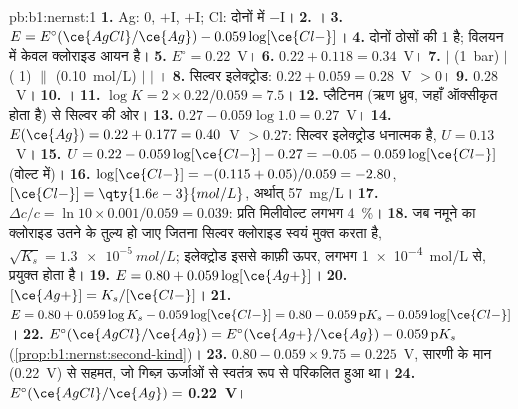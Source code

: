 \begin{solution}{pb:b1:nernst:1}
\textbf{1.} Ag: 0, $+$I, $+$I; Cl: दोनों में $-$I।
\textbf{2.} ।
\textbf{3.} $E = E^\circ(\ce{AgCl}/\ce{Ag}) - 0.059\log[\ce{Cl-}]$।
\textbf{4.} दोनों ठोसों की  1 है; विलयन में केवल क्लोराइड आयन
है।
\textbf{5.} $E^\circ = 0.22$~V।
\textbf{6.} $0.22 + 0.118 = 0.34$~V।
\textbf{7.}  $|$  (\qty{1}{bar}) $|$  ( 1)
$\|$  (\qty{0.10}{mol/L}) $|$  $|$ ।
\textbf{8.} सिल्वर इलेक्ट्रोड: $0.22 + 0.059 = 0.28$~V $> 0$।
\textbf{9.} $0.28$~V।
\textbf{10.} ।
\textbf{11.} $\log K = 2 \times 0.22/0.059 = 7.5$।
\textbf{12.} प्लैटिनम (ऋण ध्रुव, जहाँ  ऑक्सीकृत होता है) से
सिल्वर की ओर।
\textbf{13.} $0.27 - 0.059\log 1.0 = 0.27$~V।
\textbf{14.} $E(\ce{Ag}) = 0.22 + 0.177 = 0.40$~V $> 0.27$: सिल्वर
इलेक्ट्रोड धनात्मक है, $U = 0.13$~V।
\textbf{15.} $U = 0.22 - 0.059\log[\ce{Cl-}] - 0.27 = -0.05 -
0.059\log[\ce{Cl-}]$ (वोल्ट में)।
\textbf{16.} $\log[\ce{Cl-}] = -(0.115 + 0.05)/0.059 = -2.80$,
$[\ce{Cl-}] = \qty{1.6e-3}{mol/L}$, अर्थात् \qty{57}{mg/L}।
\textbf{17.} $\Delta c/c = \ln 10 \times 0.001/0.059 = 0.039$: प्रति मिलीवोल्ट लगभग
\qty{4}{\percent}।
\textbf{18.} जब नमूने का क्लोराइड उतने के तुल्य हो जाए जितना
सिल्वर क्लोराइड स्वयं मुक्त करता है, $\sqrt{K_s} = \qty{1.3e-5}{mol/L}$;
इलेक्ट्रोड इससे काफ़ी ऊपर, लगभग \qty{1e-4}{mol/L} से, प्रयुक्त होता है।
\textbf{19.} $E = 0.80 + 0.059\log[\ce{Ag+}]$।
\textbf{20.} $[\ce{Ag+}] = K_s/[\ce{Cl-}]$।
\textbf{21.} $E = 0.80 + 0.059\log K_s - 0.059\log[\ce{Cl-}] = 0.80 -
0.059\,\mathrm{p}K_s - 0.059\log[\ce{Cl-}]$।
\textbf{22.} $E^\circ(\ce{AgCl}/\ce{Ag}) = E^\circ(\ce{Ag+}/\ce{Ag}) -
0.059\,\mathrm{p}K_s$ (\cref{prop:b1:nernst:second-kind})।
\textbf{23.} $0.80 - 0.059 \times 9.75 = 0.225$~V, सारणी के मान (0.22~V) से
सहमत, जो गिब्ज़ ऊर्जाओं से स्वतंत्र रूप से परिकलित हुआ था।
\textbf{24.} $E^\circ(\ce{AgCl}/\ce{Ag}) = $ \textbf{0.22~V}।
\end{solution}
